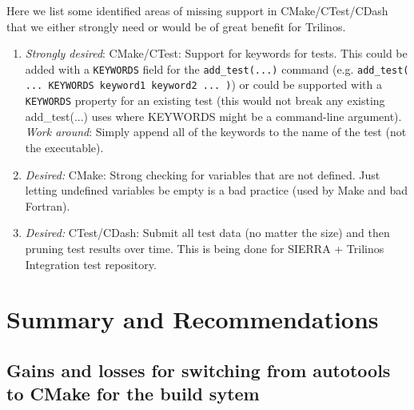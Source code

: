 \documentclass[pdf,ps2pdf,11pt]{SANDreport}
\begin{document}
Here we list some identified areas of missing support in
CMake/CTest/CDash that we either strongly need or would be of great
benefit for Trilinos.

\begin{enumerate}

{}\item\textit{Strongly desired}: CMake/CTest: Support for keywords
for tests.  This could be added with a {}\texttt{KEYWORDS} field for
the {}\texttt{add\_test(...)} command (e.g. {}\texttt{add\_test(
... KEYWORDS keyword1 keyword2 ... )}) or could be supported with a
{}\texttt{KEYWORDS} property for an existing test (this would not
break any existing add\_test(...) uses where KEYWORDS might be a
command-line argument).  {}\textit{Work around}: Simply append all of
the keywords to the name of the test (not the executable).

{}\item\textit{Desired:} CMake: Strong checking for variables that are
not defined.  Just letting undefined variables be empty is a bad
practice (used by Make and bad Fortran).

{}\item\textit{Desired:} CTest/CDash: Submit all test data (no matter
the size) and then pruning test results over time.  This is being done
for SIERRA + Trilinos Integration test repository.

\end{enumerate}


%
\section{Summary and Recommendations}
%


%
\subsection{Gains and losses for switching from autotools to CMake for the build sytem}
%
\end{document}
